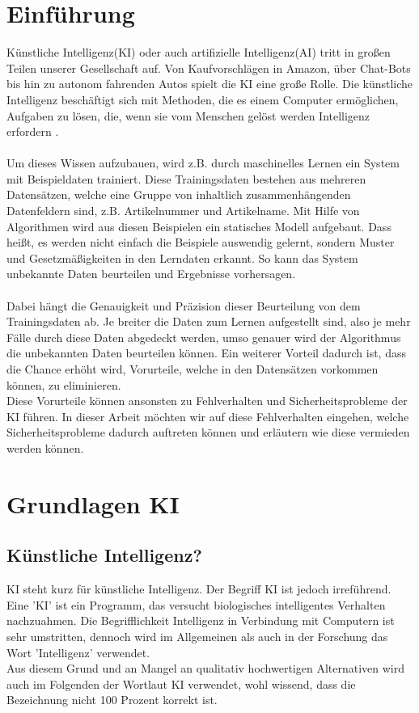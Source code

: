 \documentclass[12pt,oneside,a4paper,parskip]{scrbook}
\begin{document}
\chapter{Einführung}
\label{chapter:intro}
Künstliche Intelligenz(KI) oder auch artifizielle Intelligenz(AI) tritt in großen Teilen unserer Gesellschaft auf. Von Kaufvorschlägen in Amazon, über Chat-Bots bis hin zu autonom fahrenden Autos spielt die KI eine große Rolle. Die künstliche Intelligenz beschäftigt sich mit Methoden, die es einem Computer ermöglichen, Aufgaben zu lösen, die, wenn sie vom Menschen gelöst werden Intelligenz erfordern \cite{kiDefinition}.
\\\\
Um dieses Wissen aufzubauen, wird z.B. durch maschinelles Lernen ein System mit Beispieldaten trainiert. 
Diese Trainingsdaten bestehen aus mehreren Datensätzen, welche eine Gruppe von inhaltlich zusammenhängenden Datenfeldern sind, z.B. Artikelnummer und Artikelname.
Mit Hilfe von Algorithmen wird aus diesen Beispielen ein statisches Modell aufgebaut. Dass heißt, es werden nicht einfach die Beispiele auswendig gelernt, sondern Muster und Gesetzmäßigkeiten in den Lerndaten erkannt. So kann das System unbekannte Daten beurteilen und Ergebnisse vorhersagen.
\\\\
Dabei hängt die Genauigkeit und Präzision dieser Beurteilung von dem Trainingsdaten ab. Je breiter die Daten zum Lernen aufgestellt sind, also je mehr Fälle durch diese Daten abgedeckt werden, umso genauer wird der Algorithmus die unbekannten Daten beurteilen können. Ein weiterer Vorteil dadurch ist, dass die Chance erhöht wird, Vorurteile, welche in den Datensätzen vorkommen können, zu eliminieren.\\
Diese Vorurteile können ansonsten zu Fehlverhalten und Sicherheitsprobleme der KI führen. In dieser Arbeit möchten wir auf diese Fehlverhalten eingehen, welche Sicherheitsprobleme dadurch auftreten können und erläutern wie diese vermieden werden können.


\chapter{Grundlagen KI}

\section{Künstliche Intelligenz?}
KI steht kurz für künstliche Intelligenz. Der Begriff KI ist jedoch irreführend. Eine 'KI' ist ein Programm, das versucht biologisches intelligentes Verhalten nachzuahmen. Die Begrifflichkeit Intelligenz in Verbindung mit Computern ist sehr umstritten, dennoch wird im Allgemeinen als auch in der Forschung das Wort 'Intelligenz' verwendet. \\
Aus diesem Grund und an Mangel an qualitativ hochwertigen Alternativen wird auch im Folgenden der Wortlaut KI verwendet, wohl wissend, dass die Bezeichnung nicht 100 Prozent korrekt ist.
\end{document}
